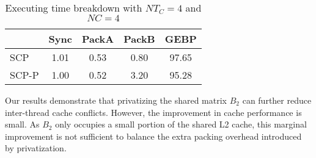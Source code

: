 \begin{table}
  \centering
  \caption{Executing time breakdown with $NT_C=4$ and $NC=4$}
  \label{tab:breakdown}
  \setlength{\tabcolsep}{3.5pt}
  \begin{tabular}{lcccc}
    \toprule
     & Sync & PackA & PackB & GEBP\\
    \midrule
    SCP   & 1.01 & 0.53 & 0.80 & 97.65 \\
    SCP-P & 1.00 & 0.52 & 3.20 & 95.28\\
    \bottomrule
  \end{tabular}
\end{table}


Our results demonstrate that privatizing the shared matrix $B_2$ can further
reduce inter-thread cache conflicts.
However, the improvement in cache performance is small.
As $B_2$ only occupies a small portion of the shared L2 cache,
this marginal improvement is not sufficient to
balance the extra packing overhead introduced
by privatization.

